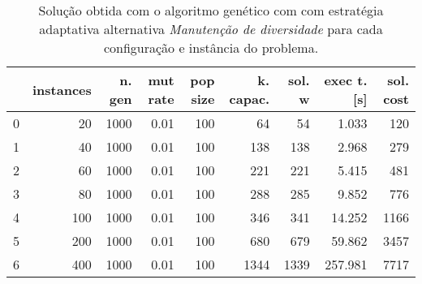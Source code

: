 \begin{table}[H]
\centering
\begin{tabular}{lrrrrrrrr}
\toprule
{} &  instances &  n. gen &  mut rate &  pop size &  k. capac. &  sol. w &  exec t. [s] &  sol. cost \\
\midrule
0 &         20 &    1000 &      0.01 &       100 &         64 &      54 &        1.033 &        120 \\
1 &         40 &    1000 &      0.01 &       100 &        138 &     138 &        2.968 &        279 \\
2 &         60 &    1000 &      0.01 &       100 &        221 &     221 &        5.415 &        481 \\
3 &         80 &    1000 &      0.01 &       100 &        288 &     285 &        9.852 &        776 \\
4 &        100 &    1000 &      0.01 &       100 &        346 &     341 &       14.252 &       1166 \\
5 &        200 &    1000 &      0.01 &       100 &        680 &     679 &       59.862 &       3457 \\
6 &        400 &    1000 &      0.01 &       100 &       1344 &    1339 &      257.981 &       7717 \\
\bottomrule
\end{tabular}
\caption{Solução obtida com o algoritmo genético com com estratégia adaptativa alternativa \textit{Manutenção de diversidade} para cada configuração e instância do problema.}
\label{table:result-diversification-maintenance}
\end{table}